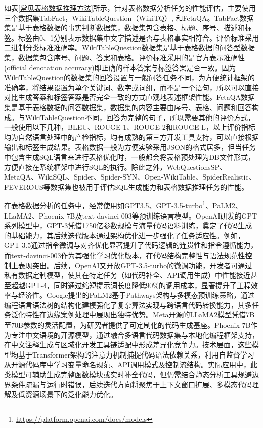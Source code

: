 如表\ref{常见表格数据推理方法}所示，针对表格数据分析任务的性能评估，主要使用三个数据集TabFact\cite{chentabfact}，WikiTableQuestion\cite{pasupat2015compositional}（WikiTQ）, 和FetaQA\cite{nan2022fetaqa}。TabFact数据集是基于表格数据的事实判断数据集，数据集包含表格、标题、序号、描述和标签。标签由0、1分别表示数据集中文字描述是否与表格事实相符合。评价标准采用二进制分类标准准确率。WikiTableQuestion数据集是基于表格数据的问答型数据集，数据集包含序号、问题、答案和表格。评价标准采用的是官方表示准确性(official denotation accuracy)即正确的样本答案与标签答案是否一致。因为WikiTableQuestion的数据集的回答设置与一般问答任务不同，为方便统计框架的准确率，将结果设置为单个关键词、数字或词组，而不是一个语句，所以可以直接对比生成答案和标签答案是否完全一致的方式直观地表述框架性能。FetaQA数据集是基于表格数据的问答数据集，数据集的内容主要由序号、表格、问题和回答构成。与WikiTableQuestion不同，回答为完整的句子，所以需要其他的评价方式，一般使用以下几种，BLEU、ROUGE-1、ROUGE-2和ROUGE-L，以上评价指标均为自然语言处理中的产检指标，均有成熟的第三方开发工具支持，可以直接根据输出和标签生成结果。表格数据一般为方便实验采用JSON的格式居多，但当任务中包含生成SQL语言来进行表格优化时，一般都会将表格预处理为DB文件形式，方便直接在系统框架中进行SQL的执行。除此之外，WebQuestionsSP\cite{yih2016value}、MetaQA\cite{zhang2018variational}、WikiSQL\cite{zhong2017seq2sql}、Spider\cite{yu2018spider}、Spider-SYN\cite{gan2021towards}、Open-WikiTable\cite{kweon2023open}、SpiderRealistic\cite{deng2021structure}、FEVEROUS\cite{aly2021fact}等数据集也被用于评估SQL生成能力和表格数据推理任务的性能。

在表格数据分析的任务中，经常使用如GPT3.5、GPT-3.5-turbo\footnote{\url{https://platform.openai.com/docs/models}}、PaLM2\cite{chowdhery2023palm}、LLaMA2\cite{touvron2023llama}、Phoenix-7B\cite{chen2023phoenix}及text-davinci-003\cite{ouyang2022training}等预训练语言模型。OpenAI研发的GPT系列模型中，GPT-3凭借1750亿参数规模与海量代码语料训练，奠定了代码生成的基础能力，其后续迭代版本通过架构优化进一步强化了任务适应性。例如，GPT-3.5通过指令微调与对齐优化显著提升了代码逻辑的连贯性和指令遵循能力，而text-davinci-003作为其强化学习优化版本，在代码结构完整性与语法规范性控制上表现突出。后续，OpenAI又开放GPT-3.5-turbo的微调功能，开发者可通过私有数据定制模型，使其在特定任务（如代码补全、API调用生成）中性能接近甚至超越GPT-4，同时通过缩短提示词长度降低90\%的调用成本，显著提升了工程效率与经济性。Google提出的PaLM2基于Pathways架构与多模态预训练策略，通过编程语言语法树的结构化建模强化了复杂算法实现与跨语言代码转换能力，其多任务泛化特性在边缘案例处理中展现出独特优势。Meta开源的LLaMA2模型凭借7B至70B参数的灵活配置，为研究者提供了可定制化的代码生成基座。Phoenix-7B作为专注中文语境的开源模型，通过融合多语言代码数据集与本地化编程框架支持，在中文注释生成与区域化开发工具链适配中形成差异化竞争力。技术层面，这些模型均基于Transformer架构的注意力机制捕捉代码语法依赖关系，利用自监督学习从开源代码库中学习变量命名规范、API调用模式及控制流结构。实际应用中，此类模型可辅助生成完整函数模块或实时补全代码，但仍需结合静态分析工具规避边界条件疏漏与运行时错误，后续迭代方向将聚焦于上下文窗口扩展、多模态代码理解及低资源场景下的泛化能力优化。

